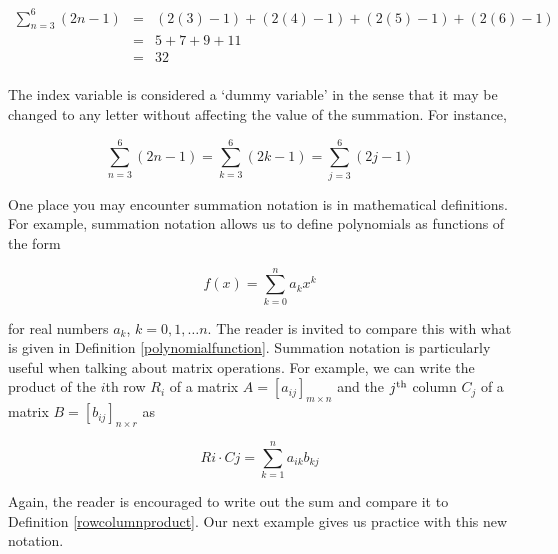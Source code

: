 \[ \begin{array}{rcl}

\displaystyle{\sum_{n=3}^{6}(2n-1) } & = & (2(3)-1) + (2(4)-1) + (2(5)-1) +  (2(6)-1) \\
                     & = &  5 + 7 + 9 + 11 \\
                     & = & 32 \\
\end{array} \]

The index variable  is considered a `dummy variable' in the sense that it may be changed to any letter without affecting the value of the summation.  For instance, 

\[ \displaystyle{\sum_{n=3}^{6}(2n-1)} = \displaystyle{\sum_{k=3}^{6}(2k-1)} = \displaystyle{\sum_{j=3}^{6}(2j-1)}\]

One place you may encounter summation notation is in mathematical definitions.  For example, summation notation allows us to define polynomials as functions of the form

\[ f(x) = \displaystyle{\sum_{k=0}^{n} a_{k} x^{k}} \]

for real numbers $a_{k}$, $k = 0, 1, \ldots n$.  The reader is invited to compare this with what is given in Definition \ref{polynomialfunction}.  Summation notation is particularly useful when talking about matrix operations.  For example, we can write the product of the $i$th row $R_{i}$ of a matrix $A = [a_{ij}]_{m \times n}$ and the $j^{\mbox{\scriptsize th}}$ column $C_{j}$ of a matrix $B = [b_{ij}]_{n \times r}$ as

\[ Ri \cdot Cj = \displaystyle{\sum_{k=1}^{n} a_{ik}b_{kj}} \]

Again, the reader is encouraged to write out the sum and compare it to Definition \ref{rowcolumnproduct}.  Our next example gives us practice with this new notation. 

